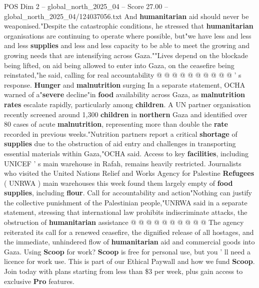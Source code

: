 \begin{textsample}{POS Dim 2 – global\_north\_2025\_04 – Score 27.00 – global\_north\_2025\_04/124037056.txt}
And \textbf{humanitarian} aid should never be weaponised."Despite the catastrophic conditions, he stressed that \textbf{humanitarian} organisations are continuing to operate where possible, but"we have less and less and less \textbf{supplies} and less and less capacity to be able to meet the growing and growing needs that are intensifying across Gaza.""Lives depend on the blockade being lifted, on aid being allowed to enter into Gaza, on the ceasefire being reinstated,"he said, calling for real accountability @ @ @ @ @ @ @ @ @ @ ' s response. \textbf{Hunger} and \textbf{malnutrition} surging In a separate statement, OCHA warned of a"\textbf{severe} decline"in \textbf{food} availability across Gaza, as \textbf{malnutrition} \textbf{rates} escalate rapidly, particularly among \textbf{children}.
A UN partner organisation recently screened around 1,300 \textbf{children} in \textbf{northern} Gaza and identified over 80 cases of acute \textbf{malnutrition}, representing more than double the \textbf{rate} recorded in previous weeks."Nutrition partners report a critical \textbf{shortage} of \textbf{supplies} due to the obstruction of aid entry and challenges in transporting essential materials within Gaza,"OCHA said.
Access to key \textbf{facilities}, including UNICEF ' s main warehouse in Rafah, remains heavily restricted.
Journalists who visited the United Nations Relief and Works Agency for Palestine \textbf{Refugees} ( UNRWA ) main warehouses this week found them largely empty of \textbf{food} \textbf{supplies}, including \textbf{flour}.
Call for accountability and action"Nothing can justify the collective punishment of the Palestinian people,"UNRWA said in a separate statement, stressing that international law prohibits indiscriminate attacks, the obstruction of \textbf{humanitarian} assistance @ @ @ @ @ @ @ @ @ @ The agency reiterated its call for a renewed ceasefire, the dignified release of all hostages, and the immediate, unhindered flow of \textbf{humanitarian} aid and commercial goods into Gaza.
Using \textbf{Scoop} for work? \textbf{Scoop} is free for personal use, but you ' ll need a licence for work use.
This is part of our Ethical Paywall and how we fund \textbf{Scoop}.
Join today with plans starting from less than \$3 per week, plus gain access to exclusive \textbf{Pro} features.

\end{textsample}
